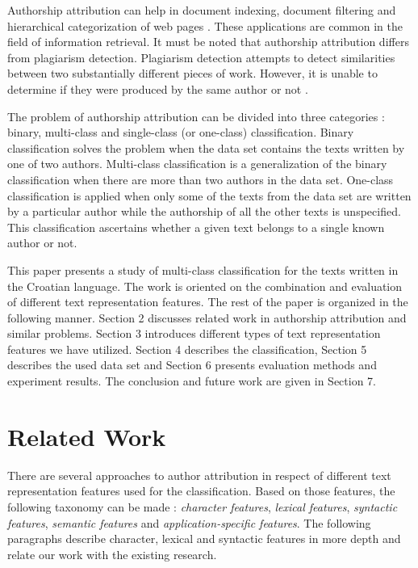 \documentclass{llncs}
\begin{document}
Authorship attribution can help in document indexing, document filtering and
hierarchical categorization of web pages \cite{luyckx2005shallow}. These
applications are common in the field of information retrieval. It must be noted
that authorship attribution differs from plagiarism detection. Plagiarism
detection attempts to detect similarities between two substantially different
pieces of work. However, it is unable to determine if they were produced by the
same author or not
\cite{de2001mining}.

The problem of authorship attribution can be divided into three categories
\cite{zhao2005effective}: binary, multi-class and single-class (or one-class)
classification. Binary classification solves the problem when the data set
contains the texts written by one of two authors. Multi-class classification is a
generalization of the binary classification when there are more than two authors
in the data set. One-class classification is applied when only some of the texts
from the data set are written by a particular author while the authorship of all
the other texts is unspecified. This classification ascertains whether a given
text belongs to a single known author or not.

This paper presents a study of multi-class classification for the texts written
in the Croatian language. The work is oriented on the combination and evaluation
of different text representation features. The rest of the paper is organized in
the following manner. Section 2 discusses related work in authorship attribution
and similar problems. Section 3 introduces different types of text representation
features we have utilized. Section 4 describes the classification, Section 5
describes the used data set and Section 6 presents evaluation methods and
experiment results. The conclusion and future work are given in Section 7.

\section{Related Work}
There are several approaches to author attribution in respect of different text
representation features used for the classification. Based on those features, the
following taxonomy can be made \cite{stamatatos2009survey}: \emph{character
features}, \emph{lexical features}, \emph{syntactic features}, \emph{semantic
features} and \emph{application-specific features}. The following paragraphs
describe character, lexical and syntactic features in more depth and relate our
work with the existing research.
\end{document}
